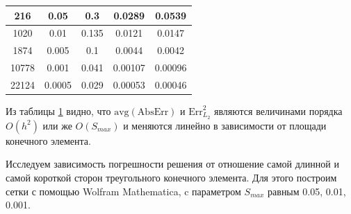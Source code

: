 \documentclass[12pt, a4paper]{article}
\begin{document}
\begin{table}[!h]
\begin{tabular}{|c|c|c|c|c|}
					\hline
					216
					& 0.05
					& 0.3
					& 0.0289 
					& 0.0539 \\ 
					
					
					\hline
					1020
					& 0.01
					& 0.135
					& 0.0121
					& 0.0147 \\ 
					
						
					\hline
					1874
					& 0.005
					& 0.1
					& 0.0044
					& 0.0042 \\
					
					\hline
					10778
					& 0.001
					& 0.041
					& 0.00107
					& 0.00096 \\ 
					
					\hline
					22124
					& 0.0005
					& 0.029
					& 0.00053 
					& 0.00046 \\ 
					
					\hline
				\end{tabular}
				\label{table: 4}				
			\end{table}		
			\vspace*{-5mm}
			
			Из таблицы \ref{table: 4} видно, что $\mathrm{avg}(\mathrm{AbsErr})$ и
			$\mathrm{Err}_{L_2}^2$ являются величинами порядка $O(h^2)$ или же $O(S_{max})$ и меняются линейно в зависимости от площади конечного элемента.
		 
			Исследуем зависимость погрешности решения от отношение самой длинной и самой короткой сторон треугольного конечного элемента. Для этого построим сетки с помощью Wolfram Mathematica, c параметром $S_{max}$ равным 0.05, 0.01, 0.001.
			
\end{document}
